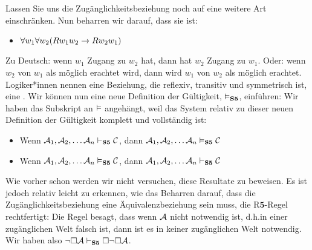 Lassen Sie uns die Zugänglichkeitsbeziehung noch auf eine weitere Art einschränken. Nun beharren wir darauf, dass sie  ist:
\begin{itemize}
	\item $\forall w_1\forall w_2(Rw_1w_2 \rightarrow Rw_2w_1)$
\end{itemize}
Zu Deutsch: wenn $w_1$ Zugang zu $w_2$ hat, dann hat $w_2$ Zugang zu $w_1$. Oder: wenn $w_2$ von $w_1$ als möglich erachtet wird, dann wird $w_1$ von $w_2$ als möglich erachtet. Logiker*innen nennen eine Beziehung, die reflexiv, transitiv und symmetrisch ist, eine . Wir können nun eine neue Definition der Gültigkeit, $\vDash_{\mathbf{S5}} $, einführen:
Wir haben das \mlSfive{} Subskript an $\vDash$ angehängt, weil das System \mlSfive{} relativ zu dieser neuen Definition der Gültigkeit komplett und vollständig ist:
\begin{itemize}
	\item Wenn $\mathcal{A}_1,\mathcal{A}_2, \dots \mathcal{A}_n\vdash_{\mathbf{S5}} \mathcal{C}$, dann $\mathcal{A}_1,\mathcal{A}_2, \dots \mathcal{A}_n\vDash_{\mathbf{S5}} \mathcal{C}$
	\item Wenn $\mathcal{A}_1,\mathcal{A}_2, \dots \mathcal{A}_n\vDash_{\mathbf{S5}} \mathcal{C}$, dann $\mathcal{A}_1,\mathcal{A}_2, \dots \mathcal{A}_n\vdash_{\mathbf{S5}} \mathcal{C}$
\end{itemize}
Wie vorher schon werden wir nicht versuchen, diese Resultate zu beweisen. Es ist jedoch relativ leicht zu erkennen, wie das Beharren darauf, dass die Zugänglichkeitsbeziehung eine Äquivalenzbeziehung sein muss, die R$\mathbf{5}$-Regel rechtfertigt:
Die Regel besagt, dass wenn $\mathcal{A}$ nicht notwendig ist, d.h.\@ in einer zugänglichen Welt falsch ist, dann ist es in keiner zugänglichen Welt notwendig. Wir haben also $\neg\Box \mathcal{A} \vdash_{\mathbf{S5}}  \Box\neg\Box \mathcal{A}$.

